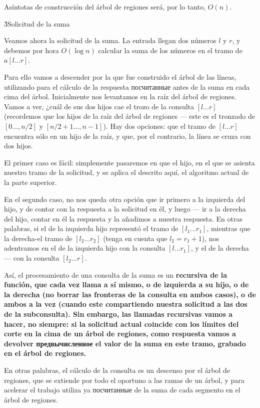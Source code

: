 Asíntotas de construcción del árbol de regiones será, por lo tanto, $O(n)$.


\h3{Solicitud de la suma}

Veamos ahora la solicitud de la suma. La entrada llegan dos números $l$ y $r$, y debemos por hora $O (\log n)$ calcular la suma de los números en el tramo de $a[l \ldots r]$.

Para ello vamos a descender por la que fue construido el árbol de las líneas, utilizando para el cálculo de la respuesta посчитанные antes de la suma en cada cima del árbol. Inicialmente nos levantamos en la raíz del árbol de regiones. Vamos a ver, ¿cuál de sus dos hijos cae el trozo de la consulta $[l \ldots r]$ (recordemos que los hijos de la raíz del árbol de regiones --- este es el tronzado de $[0 \ldots, n/2]$ y $[n/2+1 \ldots, n-1]$). Hay dos opciones: que el tramo de $[l \ldots r]$ encuentra sólo en un hijo de la raíz, y que, por el contrario, la línea se cruza con dos hijos.

El primer caso es fácil: simplemente pasaremos en que el hijo, en el que se asienta nuestro tramo de la solicitud, y se aplica el descrito aquí, el algoritmo actual de la parte superior.

En el segundo caso, no nos queda otra opción que ir primero a la izquierda del hijo, y de contar con la respuesta a la solicitud en él, y luego --- ir a la derecha del hijo, contar en él la respuesta y la añadimos a nuestra respuesta. En otras palabras, si el de la izquierda hijo representó el tramo de $[l_1 \ldots r_1]$, mientras que la derecha-el tramo de $[l_2 \ldots r_2]$ (tenga en cuenta que $l_2 = r_1 + 1$), nos adentramos en el de la izquierda hijo con la consulta $[l \ldots r_1]$, y el de la derecha --- con la consulta $[l_2 \ldots r]$.

Así, el procesamiento de una consulta de la suma es un \bf{recursiva de la función}, que cada vez llama a sí mismo, o de izquierda a su hijo, o de la derecha (no borrar las fronteras de la consulta en ambos casos), o de ambos a la vez (cuando este compartiendo nuestra solicitud a las dos de la subconsulta). Sin embargo, las llamadas recursivas vamos a hacer, no siempre: si la solicitud actual coincide con los límites del corte en la cima de un árbol de regiones, como respuesta vamos a devolver предвычисленное el valor de la suma en este tramo, grabado en el árbol de regiones.

En otras palabras, el cálculo de la consulta es un descenso por el árbol de regiones, que se extiende por todo el oportuno a las ramas de un árbol, y para acelerar el trabajo utiliza ya посчитанные de la suma de cada segmento en el árbol de regiones.

